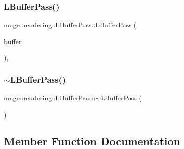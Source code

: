 \hypertarget{classmage_1_1rendering_1_1_l_buffer_pass_a708f765ebb9416b9e9258f78c926331e}{}\label{classmage_1_1rendering_1_1_l_buffer_pass_a708f765ebb9416b9e9258f78c926331e} 
\subsubsection{\texorpdfstring{L\+Buffer\+Pass()}{LBufferPass()}\hspace{0.1cm}{\footnotesize\ttfamily [3/3]}}
{\footnotesize\ttfamily mage\+::rendering\+::\+L\+Buffer\+Pass\+::\+L\+Buffer\+Pass (\begin{DoxyParamCaption}\item[{\hyperlink{classmage_1_1rendering_1_1_l_buffer_pass}{L\+Buffer\+Pass} \&\&}]{buffer }\end{DoxyParamCaption})\hspace{0.3cm}{\ttfamily [default]}, {\ttfamily [noexcept]}}

\hypertarget{classmage_1_1rendering_1_1_l_buffer_pass_a91261b9de58ca001a4e78cc1dd2c1f4b}{}\label{classmage_1_1rendering_1_1_l_buffer_pass_a91261b9de58ca001a4e78cc1dd2c1f4b} 
\subsubsection{\texorpdfstring{$\sim$\+L\+Buffer\+Pass()}{~LBufferPass()}}
{\footnotesize\ttfamily mage\+::rendering\+::\+L\+Buffer\+Pass\+::$\sim$\+L\+Buffer\+Pass (\begin{DoxyParamCaption}{ }\end{DoxyParamCaption})\hspace{0.3cm}{\ttfamily [default]}}



\subsection{Member Function Documentation}
\hypertarget{classmage_1_1rendering_1_1_l_buffer_pass_a23370698fd80713b0ea31e1d54a35d44}{}\label{classmage_1_1rendering_1_1_l_buffer_pass_a23370698fd80713b0ea31e1d54a35d44} 
